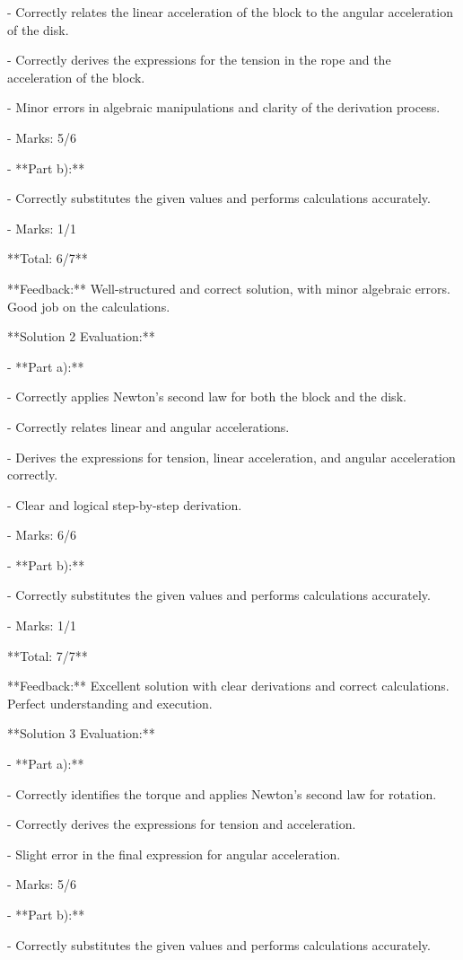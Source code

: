 \documentclass[a4paper,11pt]{article}
\begin{document}
  - Correctly relates the linear acceleration of the block to the angular acceleration of the disk.
  
  - Correctly derives the expressions for the tension in the rope and the acceleration of the block.
  
  - Minor errors in algebraic manipulations and clarity of the derivation process.
  
  - Marks: 5/6

- **Part b):**

  - Correctly substitutes the given values and performs calculations accurately.
  
  - Marks: 1/1

**Total: 6/7**

**Feedback:** Well-structured and correct solution, with minor algebraic errors. Good job on the calculations.

**Solution 2 Evaluation:**

- **Part a):**

  - Correctly applies Newton's second law for both the block and the disk.
  
  - Correctly relates linear and angular accelerations.
  
  - Derives the expressions for tension, linear acceleration, and angular acceleration correctly.
  
  - Clear and logical step-by-step derivation.
  
  - Marks: 6/6

- **Part b):**

  - Correctly substitutes the given values and performs calculations accurately.
  
  - Marks: 1/1

**Total: 7/7**

**Feedback:** Excellent solution with clear derivations and correct calculations. Perfect understanding and execution.

**Solution 3 Evaluation:**

- **Part a):**

  - Correctly identifies the torque and applies Newton's second law for rotation.
  
  - Correctly derives the expressions for tension and acceleration.
  
  - Slight error in the final expression for angular acceleration.
  
  - Marks: 5/6

- **Part b):**

  - Correctly substitutes the given values and performs calculations accurately.
  
\end{document}
